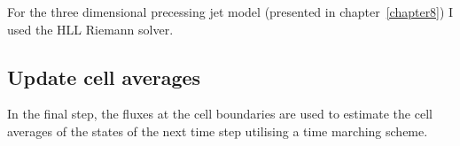 For the three dimensional precessing jet model (presented in chapter~\ref{chapter8}) I used the HLL Riemann solver. 





\subsection{Update cell averages}

In the final step, the fluxes at the cell boundaries are used to estimate the cell averages of the states of the next time step utilising a time marching scheme. 


% 
%
%

